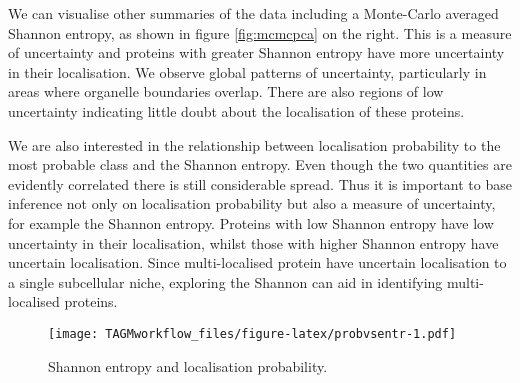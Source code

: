 \documentclass[]{article}
\newenvironment{Shaded}{\begin{snugshade}}{\end{snugshade}}
\newcommand{\KeywordTok}[1]{\textcolor[rgb]{0.13,0.29,0.53}{\textbf{{#1}}}}
\newcommand{\DataTypeTok}[1]{\textcolor[rgb]{0.13,0.29,0.53}{{#1}}}
\newcommand{\DecValTok}[1]{\textcolor[rgb]{0.00,0.00,0.81}{{#1}}}
\newcommand{\FloatTok}[1]{\textcolor[rgb]{0.00,0.00,0.81}{{#1}}}
\newcommand{\StringTok}[1]{\textcolor[rgb]{0.31,0.60,0.02}{{#1}}}
\newcommand{\NormalTok}[1]{{#1}}
\begin{document}
We can visualise other summaries of the data including a Monte-Carlo
averaged Shannon entropy, as shown in figure \ref{fig:mcmcpca} on the
right. This is a measure of uncertainty and proteins with greater
Shannon entropy have more uncertainty in their localisation. We observe
global patterns of uncertainty, particularly in areas where organelle
boundaries overlap. There are also regions of low uncertainty indicating
little doubt about the localisation of these proteins.

We are also interested in the relationship between localisation
probability to the most probable class and the Shannon entropy. Even
though the two quantities are evidently correlated there is still
considerable spread. Thus it is important to base inference not only on
localisation probability but also a measure of uncertainty, for example
the Shannon entropy. Proteins with low Shannon entropy have low
uncertainty in their localisation, whilst those with higher Shannon
entropy have uncertain localisation. Since multi-localised protein have
uncertain localisation to a single subcellular niche, exploring the
Shannon can aid in identifying multi-localised proteins.

\begin{Shaded}
\end{Shaded}

\begin{figure}[htbp]
\centering
\texttt{[image: TAGMworkflow\_files/figure-latex/probvsentr-1.pdf]}
\caption{\label{fig:probvsentr}Shannon entropy and localisation
probability.}
\end{figure}
\end{document}
